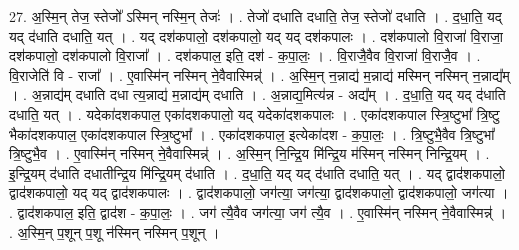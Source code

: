 \documentclass[17pt]{extarticle}
\begin{document}
27. अ॒स्मि॒न् तेज॒ स्तेजो᳚ ऽस्मिन् नस्मि॒न् तेजः॑ । . तेजो॑ दधाति दधाति॒ तेज॒ स्तेजो॑ दधाति । . द॒धा॒ति॒ यद् यद् द॑धाति दधाति॒ यत् । . यद् दश॑कपालो॒ दश॑कपालो॒ यद् यद् दश॑कपालः । . दश॑कपालो वि॒राजा॑ वि॒राजा॒ दश॑कपालो॒ दश॑कपालो वि॒राजा᳚ । . दश॑कपाल॒ इति॒ दश॑ - क॒पा॒लः॒ । . वि॒राजै॒वैव वि॒राजा॑ वि॒राजै॒व । . वि॒राजेति॑ वि - राजा᳚ । . ए॒वास्मि॑न् नस्मिन् ने॒वैवास्मिन्न्॑ । . अ॒स्मि॒न् न॒न्नाद्य॑ म॒न्नाद्य॑ मस्मिन् नस्मिन् न॒न्नाद्य᳚म् । . अ॒न्नाद्य॑म् दधाति दधा त्य॒न्नाद्य॑ म॒न्नाद्य॑म् दधाति । . अ॒न्नाद्य॒मित्य॑न्न - अद्य᳚म् । . द॒धा॒ति॒ यद् यद् द॑धाति दधाति॒ यत् । . यदेका॑दशकपाल॒ एका॑दशकपालो॒ यद् यदेका॑दशकपालः । . एका॑दशकपाल स्त्रि॒ष्टुभा᳚ त्रि॒ष्टु भैका॑दशकपाल॒ एका॑दशकपाल स्त्रि॒ष्टुभा᳚ । . एका॑दशकपाल॒ इत्येका॑दश - क॒पा॒लः॒ । . त्रि॒ष्टुभै॒वैव त्रि॒ष्टुभा᳚ त्रि॒ष्टुभै॒व । . ए॒वास्मि॑न् नस्मिन् ने॒वैवास्मिन्न्॑ । . अ॒स्मि॒न् नि॒न्द्रि॒य मि॑न्द्रि॒य म॑स्मिन् नस्मिन् निन्द्रि॒यम् । . इ॒न्द्रि॒यम् द॑धाति दधातीन्द्रि॒य मि॑न्द्रि॒यम् द॑धाति । . द॒धा॒ति॒ यद् यद् द॑धाति दधाति॒ यत् । . यद् द्वाद॑शकपालो॒ द्वाद॑शकपालो॒ यद् यद् द्वाद॑शकपालः । . द्वाद॑शकपालो॒ जग॑त्या॒ जग॑त्या॒ द्वाद॑शकपालो॒ द्वाद॑शकपालो॒ जग॑त्या । . द्वाद॑शकपाल॒ इति॒ द्वाद॑श - क॒पा॒लः॒ । . जग॑ त्यै॒वैव जग॑त्या॒ जग॑ त्यै॒व । . ए॒वास्मि॑न् नस्मिन् ने॒वैवास्मिन्न्॑ । . अ॒स्मि॒न् प॒शून् प॒शू न॑स्मिन् नस्मिन् प॒शून् । \newline
\end{document}
